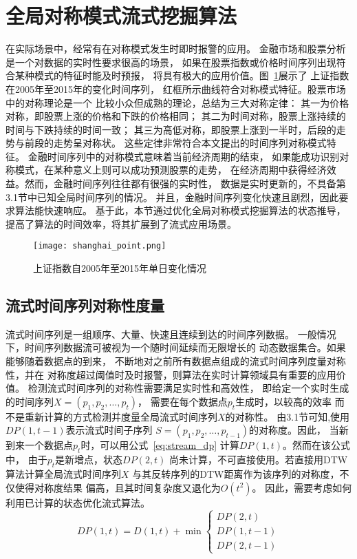 \section{全局对称模式流式挖掘算法}
在实际场景中，经常有在对称模式发生时即时报警的应用。
金融市场和股票分析是一个对数据的实时性要求很高的场景，
如果在股票指数或价格时间序列出现符合某种模式的特征时能及时预报，
将具有极大的应用价值。图~\ref{fig:shanghai_point}展示了
上证指数在2005年至2015年的变化时间序列，
红框所示曲线符合对称模式特征。股票市场中的对称理论是一个
比较小众但成熟的理论，总结为三大对称定律：
其一为价格对称，即股票上涨的价格和下跌的价格相同；
其二为时间对称，股票上涨持续的时间与下跌持续的时间一致；
其三为高低对称，即股票上涨到一半时，后段的走势与前段的走势呈对称状。
这些定律非常符合本文提出的时间序列对称模式特征。
金融时间序列中的对称模式意味着当前经济周期的结束，
如果能成功识别对称模式，在某种意义上则可以成功预测股票的走势，
在经济周期中获得经济效益。然而，金融时间序列往往都有很强的实时性，
数据是实时更新的，不具备第3.1节中已知全局时间序列的情况。
并且，金融时间序列变化快速且剧烈，因此要求算法能快速响应。
基于此，本节通过优化全局对称模式挖掘算法的状态推导，
提高了算法的时间效率，将其扩展到了流式应用场景。
\begin{figure}
  \centering
  \texttt{[image: shanghai\_point.png]}
  \caption{上证指数自2005年至2015年单日变化情况}
  \label{fig:shanghai_point}
\end{figure}

\subsection{流式时间序列对称性度量}
流式时间序列是一组顺序、大量、快速且连续到达的时间序列数据。
一般情况下，时间序列数据流可被视为一个随时间延续而无限增长的
动态数据集合。如果能够随着数据点的到来，
不断地对之前所有数据点组成的流式时间序列度量对称性，并在
对称度超过阈值时及时报警，则算法在实时计算领域具有重要的应用价值。
检测流式时间序列的对称性需要满足实时性和高效性，
即给定一个实时生成的时间序列$X=(p_1,p_2,\dots,p_t)$，
需要在每个数据点$p_t$生成时，以较高的效率
而不是重新计算的方式检测并度量全局流式时间序列$X$的对称性。
由3.1节可知,使用$DP\left(1,t-1\right)$表示流式时间子序列
$S=(p_1,p_2,\dots,p_{t-1} )$的对称度。因此，
当新到来一个数据点$p_{t}$时，可以用公式~\ref{eq:stream_dp}
计算$DP\left(1,t\right)$。然而在该公式中，
由于$p_{t}$是新增点，状态$DP\left(2,t\right)$
尚未计算，不可直接使用。若直接用DTW算法计算全局流式时间序列$X$
与其反转序列的DTW距离作为该序列的对称度，不仅使得对称度结果
偏高，且其时间复杂度又退化为$O\left(t^2\right)$。
因此，需要考虑如何利用已计算的状态优化流式算法。
\begin{equation}
  DP(1, t)=D(1, t)+\min \left\{\begin{array}{c}
    D P(2, t) \\
    D P(1, t-1) \\
    D P(2, t-1)
    \end{array}\right.
  \label{eq:stream_dp}
\end{equation}

